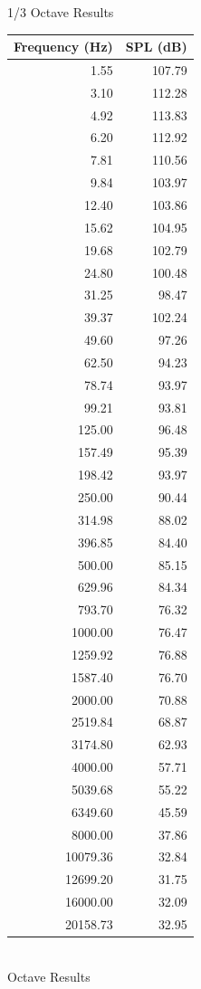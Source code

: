 \documentclass[onecolumn,10pt]{jhwhw}
\begin{document}
\clearpage
\begin{multicols}{2}
1/3 Octave Results\\

\begin{tabular}{rr}
\toprule
   Frequency (Hz) &         SPL (dB) \\
\midrule
    1.55 &  107.79 \\
    3.10 &  112.28 \\
    4.92 &  113.83 \\
    6.20 &  112.92 \\
    7.81 &  110.56 \\
    9.84 &  103.97 \\
   12.40 &  103.86 \\
   15.62 &  104.95 \\
   19.68 &  102.79 \\
   24.80 &  100.48 \\
   31.25 &   98.47 \\
   39.37 &  102.24 \\
   49.60 &   97.26 \\
   62.50 &   94.23 \\
   78.74 &   93.97 \\
   99.21 &   93.81 \\
  125.00 &   96.48 \\
  157.49 &   95.39 \\
  198.42 &   93.97 \\
  250.00 &   90.44 \\
  314.98 &   88.02 \\
  396.85 &   84.40 \\
  500.00 &   85.15 \\
  629.96 &   84.34 \\
  793.70 &   76.32 \\
 1000.00 &   76.47 \\
 1259.92 &   76.88 \\
 1587.40 &   76.70 \\
 2000.00 &   70.88 \\
 2519.84 &   68.87 \\
 3174.80 &   62.93 \\
 4000.00 &   57.71 \\
 5039.68 &   55.22 \\
 6349.60 &   45.59 \\
 8000.00 &   37.86 \\
10079.36 &   32.84 \\
12699.20 &   31.75 \\
16000.00 &   32.09 \\
20158.73 &   32.95 \\
\bottomrule
\end{tabular}
\\Octave Results\\


\end{multicols}
\end{document}
